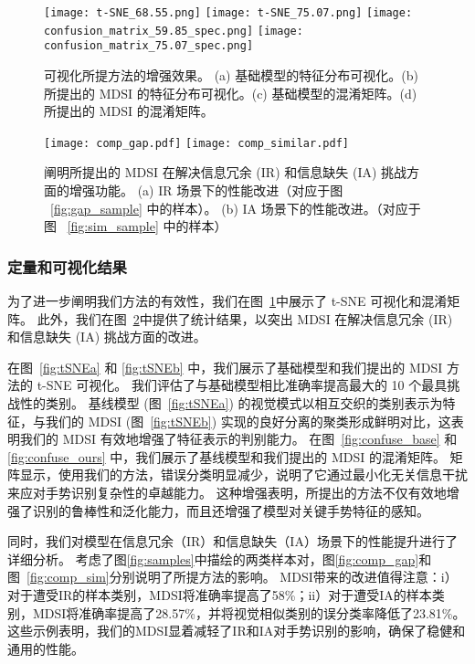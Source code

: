 \begin{figure}
  \centering
  \subcaptionbox{\label{fig:tSNEa}}
    {\texttt{[image: t-SNE\_68.55.png]}}
  \subcaptionbox{\label{fig:tSNEb}}
    {\texttt{[image: t-SNE\_75.07.png]}}
  \subcaptionbox{\label{fig:confuse_base}}
    {\texttt{[image: confusion\_matrix\_59.85\_spec.png]}}
  \subcaptionbox{\label{fig:confuse_ours}}
    {\texttt{[image: confusion\_matrix\_75.07\_spec.png]}}
  \caption{可视化所提方法的增强效果。 (a) 基础模型的特征分布可视化。(b) 所提出的 MDSI 的特征分布可视化。(c) 基础模型的混淆矩阵。(d) 所提出的 MDSI 的混淆矩阵。}
  \label{fig:vis}
\end{figure}

\begin{figure}
  \centering
  \subcaptionbox{\label{fig:comp_gap}}
    {\texttt{[image: comp\_gap.pdf]}}
  \subcaptionbox{\label{fig:comp_sim}}
    {\texttt{[image: comp\_similar.pdf]}}
  \caption{阐明所提出的 MDSI 在解决信息冗余 (IR) 和信息缺失 (IA) 挑战方面的增强功能。 (a) IR 场景下的性能改进（对应于图 ~\ref{fig:gap_sample} 中的样本）。 (b) IA 场景下的性能改进。（对应于图 ~\ref{fig:sim_sample} 中的样本）}
  \label{fig:comp}
\end{figure}

\subsubsection{定量和可视化结果}
为了进一步阐明我们方法的有效性，我们在图~\ref{fig:vis}中展示了 t-SNE 可视化和混淆矩阵。
此外，我们在图~\ref{fig:comp}中提供了统计结果，以突出 MDSI 在解决信息冗余 (IR) 和信息缺失 (IA) 挑战方面的改进。

在图~\ref{fig:tSNEa} 和 \ref{fig:tSNEb} 中，我们展示了基础模型和我们提出的 MDSI 方法的 t-SNE 可视化。
我们评估了与基础模型相比准确率提高最大的 10 个最具挑战性的类别。
基线模型 (图~\ref{fig:tSNEa}) 的视觉模式以相互交织的类别表示为特征，与我们的 MDSI (图~\ref{fig:tSNEb}) 实现的良好分离的聚类形成鲜明对比，这表明我们的 MDSI 有效地增强了特征表示的判别能力。
在图~\ref{fig:confuse_base} 和 \ref{fig:confuse_ours} 中，我们展示了基线模型和我们提出的 MDSI 的混淆矩阵。
矩阵显示，使用我们的方法，错误分类明显减少，说明了它通过最小化无关信息干扰来应对手势识别复杂性的卓越能力。
这种增强表明，所提出的方法不仅有效地增强了识别的鲁棒性和泛化能力，而且还增强了模型对关键手势特征的感知。

同时，我们对模型在信息冗余（IR）和信息缺失（IA）场景下的性能提升进行了详细分析。
考虑了图\ref{fig:samples}中描绘的两类样本对，图\ref{fig:comp_gap}和图~\ref{fig:comp_sim}分别说明了所提方法的影响。
MDSI带来的改进值得注意：i）对于遭受IR的样本类别，MDSI将准确率提高了58\%；ii）对于遭受IA的样本类别，MDSI将准确率提高了28.57\%，并将视觉相似类别的误分类率降低了23.81\%。
这些示例表明，我们的MDSI显着减轻了IR和IA对手势识别的影响，确保了稳健和通用的性能。


